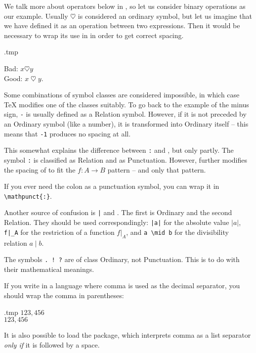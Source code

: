 We talk more about operators below in ,
so let us consider binary operations as our example.
Usually $\heartsuit$ is considered an ordinary symbol,
but let us imagine that we have defined it as an operation between two expressions.
Then it would be necessary to wrap its use in  in order to get correct spacing.
%
\begin{VerbatimOut}{\jobname.tmp}
\newcommand{\friends}{\mathbin\heartsuit}

Bad: $x \heartsuit y$\\
Good: $x \friends y$.
\end{VerbatimOut}
\ShowExample
%
Some combinations of symbol classes are considered impossible,
in which case \TeX{} modifies one of the classes suitably.
To go back to the example of the minus sign,
\verb|-| is usually defined as a Relation symbol.
However, if it is not preceded by an Ordinary symbol (like a number),
it is transformed into Ordinary itself -- this means that \verb|-1| produces no spacing at all.

\begin{gotcha}
This somewhat explains the difference between \verb|:| and , but only partly.
The symbol \verb|:| is classified as Relation and  as Punctuation.
However,  further modifies the spacing of 
to fit the $f \colon A \to B$ pattern -- and only that pattern.

If you ever need the colon as a punctuation symbol, you can wrap it in \verb|\mathpunct{:}|.
\end{gotcha}

\begin{gotcha}
Another source of confusion is \verb.|. and .
The first is Ordinary and the second Relation.
They should be used correspondingly:
\verb.|a|. for the absolute value $|a|$,
\verb.f|_A. for the restriction of a function $f|_A$,
and \verb.a \mid b. for the divisibility relation $a \mid b$.
\end{gotcha}

\begin{gotcha}
The symbols \verb|. ! ?| are of class Ordinary, not Punctuation.
This is to do with their mathematical meanings.
\end{gotcha}

\begin{gotcha}
If you write in a language where comma is used as the decimal separator,
you should wrap the comma in parentheses:
%
\begin{VerbatimOut}{\jobname.tmp}
$123,456$\\
$123{,}456$
\end{VerbatimOut}
\ShowExample
%
It is also possible to load the  package,
which interprets comma as a list separator \emph{only if} it is followed by a space.
\end{gotcha}

